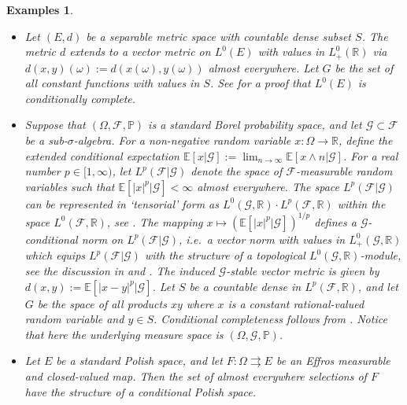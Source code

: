 \documentclass{jloganal}
\numberwithin{equation}{section}
\theoremstyle{plain}
\newtheorem{examples}[subsection]{Examples}
\begin{document}
\begin{examples}\label{exp:metricspaces}
\begin{itemize}
\item[a)] Let $(E,d)$ be a separable metric space with countable dense subset $S$.      
The metric $d$ extends to a vector metric on $L^0(E)$ with values in $L^0_+(\mathbb{R})$ via $d(x,y)(\omega):=d(x(\omega),y(\omega))$ almost everywhere. 
Let $G$ be the set of all constant functions with values in $S$.   
See \cite[Sections 2 and 4]{DJK16} for a proof that $L^0(E)$ is conditionally complete.  
\item[b)] Suppose that $(\Omega,\mathcal{F},\mathbb{P})$ is a standard Borel probability space, and let $\mathcal{G}\subset \mathcal{F}$ be a sub-$\sigma$-algebra. For a non-negative random variable $x\colon \Omega\to \mathbb{R}$, define the extended conditional expectation $\mathbb{E}[ x | \mathcal{G}]:=\lim_{n\to \infty} \mathbb{E}[ x\wedge n| \mathcal{G}]$. 
For a real number $p\in[1,\infty)$, let $L^{p}(\mathcal{F}|\mathcal{G})$ denote the space of $\mathcal{F}$-measurable random variables such that $\mathbb{E}[|x|^p|\mathcal{G}]<\infty$ almost everywhere. The space $L^{p}(\mathcal{F}|\mathcal{G})$ can be represented in `tensorial' form as $L^0(\mathcal{G},\mathbb{R})\cdot L^p(\mathcal{F},\mathbb{R})$ within the space $L^0(\mathcal{F},\mathbb{R})$, see \cite[Proposition 1]{cerreia2016conditional}.  
The mapping $x\mapsto (\mathbb{E}[|x|^p|\mathcal{G}])^{1/p}$ defines a \emph{$\mathcal{G}$-conditional norm} on $L^{p}(\mathcal{F}|\mathcal{G})$, i.e.~a vector norm with values in $L^0_+(\mathcal{G},\mathbb{R})$ which equips $L^{p}(\mathcal{F}|\mathcal{G})$ with the structure of a topological $L^0(\mathcal{G},\mathbb{R})$-module, see the discussion in \cite[Example 2.5]{filipovic2009separation} and \cite[Section 8]{cerreia2016conditional}. 
The induced $\mathcal{G}$-stable vector metric is given by $d(x,y):=\mathbb{E}[|x-y|^p|\mathcal{G}]$. 
Let $S$ be a countable dense in $L^p(\mathcal{F},\mathbb{R})$, and let $G$ be the space of all products $x y$ where $x$ is a constant rational-valued random variable and $y\in S$.   
Conditional completeness follows from \cite[Theorem 3.2.3]{vogelpoth2009phd}.   
Notice that here the underlying measure space is $(\Omega,\mathcal{G},\mathbb{P})$.  
\item[c)] Let $E$ be a standard Polish space, and let $F\colon \Omega\rightrightarrows E$ be an Effros measurable and closed-valued map. 
Then the set of almost everywhere selections of $F$ have the structure of a conditional Polish space.   
\end{itemize} 
\end{examples}
\end{document}
